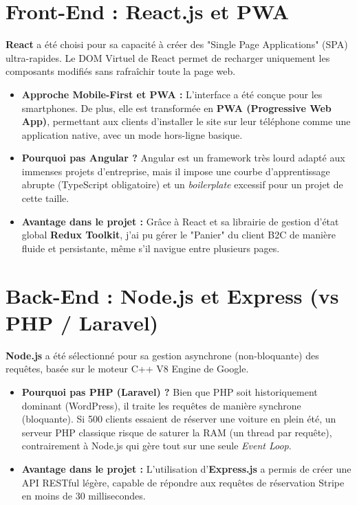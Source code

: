 \documentclass[12pt, a4paper]{report}
\begin{document}
\section{Front-End : React.js et PWA}
\textbf{React} a été choisi pour sa capacité à créer des "Single Page Applications" (SPA) ultra-rapides. Le DOM Virtuel de React permet de recharger uniquement les composants modifiés sans rafraîchir toute la page web.
\begin{itemize}
    \item \textbf{Approche Mobile-First et PWA :} L'interface a été conçue pour les smartphones. De plus, elle est transformée en \textbf{PWA (Progressive Web App)}, permettant aux clients d'installer le site sur leur téléphone comme une application native, avec un mode hors-ligne basique.
    \item \textbf{Pourquoi pas Angular ?} Angular est un framework très lourd adapté aux immenses projets d'entreprise, mais il impose une courbe d'apprentissage abrupte (TypeScript obligatoire) et un \textit{boilerplate} excessif pour un projet de cette taille.
    \item \textbf{Avantage dans le projet :} Grâce à React et sa librairie de gestion d'état global \textbf{Redux Toolkit}, j'ai pu gérer le "Panier" du client B2C de manière fluide et persistante, même s'il navigue entre plusieurs pages.
\end{itemize}

\section{Back-End : Node.js et Express (vs PHP / Laravel)}
\textbf{Node.js} a été sélectionné pour sa gestion asynchrone (non-bloquante) des requêtes, basée sur le moteur C++ V8 Engine de Google. 
\begin{itemize}
    \item \textbf{Pourquoi pas PHP (Laravel) ?} Bien que PHP soit historiquement dominant (WordPress), il traite les requêtes de manière synchrone (bloquante). Si 500 clients essaient de réserver une voiture en plein été, un serveur PHP classique risque de saturer la RAM (un thread par requête), contrairement à Node.js qui gère tout sur une seule \textit{Event Loop}.
    \item \textbf{Avantage dans le projet :} L'utilisation d'\textbf{Express.js} a permis de créer une API RESTful légère, capable de répondre aux requêtes de réservation Stripe en moins de 30 millisecondes.
\end{itemize}
\end{document}
